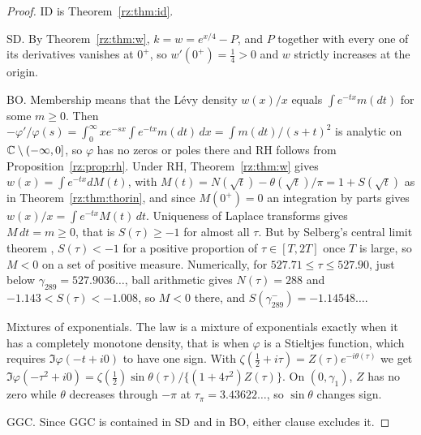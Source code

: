 \begin{proof}
ID is Theorem~\ref{rz:thm:id}.

SD. By Theorem~\ref{rz:thm:w}, $k=w=e^{x/4}-P$, and $P$ together with every one of its derivatives vanishes at $0^+$, so $w'(0^+)=\frac14>0$ and $w$ strictly increases at the origin.

BO. Membership means that the L\'evy density $w(x)/x$ equals $\int e^{-tx}m(dt)$ for some $m\ge0$. Then $-\varphi'/\varphi(s)=\int_0^\infty xe^{-sx}\int e^{-tx}m(dt)\,dx=\int m(dt)/(s+t)^2$ is analytic on $\mathbb{C}\setminus(-\infty,0]$, so $\varphi$ has no zeros or poles there and RH follows from Proposition~\ref{rz:prop:rh}. Under RH, Theorem~\ref{rz:thm:w} gives $w(x)=\int e^{-tx}dM(t)$, with $M(t)=N(\sqrt t)-\theta(\sqrt t)/\pi=1+S(\sqrt t)$ as in Theorem~\ref{rz:thm:thorin}, and since $M(0^+)=0$ an integration by parts gives $w(x)/x=\int e^{-tx}M(t)\,dt$. Uniqueness of Laplace transforms gives $M\,dt=m\ge0$, that is $S(\tau)\ge-1$ for almost all $\tau$. But by Selberg's central limit theorem \cite{Selberg46}, $S(\tau)<-1$ for a positive proportion of $\tau\in[T,2T]$ once $T$ is large, so $M<0$ on a set of positive measure. Numerically, for $527.71\le\tau\le527.90$, just below $\gamma_{289}=527.9036\ldots$, ball arithmetic gives $N(\tau)=288$ and $-1.143<S(\tau)<-1.008$, so $M<0$ there, and $S(\gamma_{289}^-)=-1.14548\ldots$.

Mixtures of exponentials. The law is a mixture of exponentials exactly when it has a completely monotone density, that is when $\varphi$ is a Stieltjes function, which requires $\Im\varphi(-t+i0)$ to have one sign. With $\zeta(\frac12+i\tau)=Z(\tau)e^{-i\theta(\tau)}$ we get $\Im\varphi(-\tau^2+i0)=\zeta(\frac12)\sin\theta(\tau)/\{(1+4\tau^2)Z(\tau)\}$. On $(0,\gamma_1)$, $Z$ has no zero while $\theta$ decreases through $-\pi$ at $\tau_\pi=3.43622\ldots$, so $\sin\theta$ changes sign.

GGC. Since GGC is contained in SD and in BO, either clause excludes it.
\end{proof}

